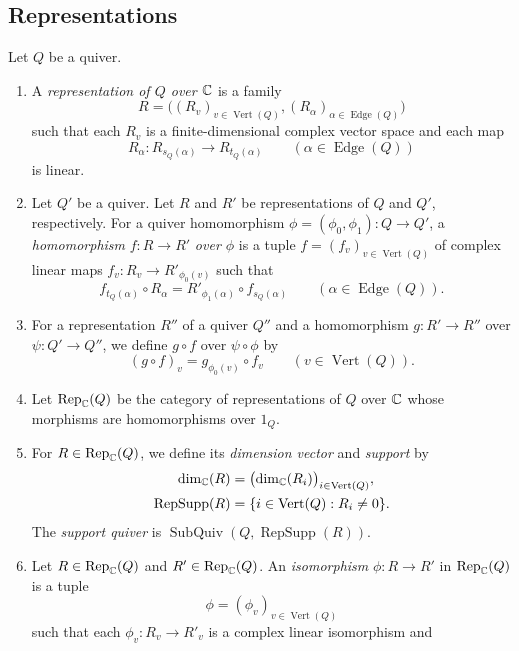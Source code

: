 \subsection{Representations}\label{subsec:quiver-representations}
\begin{definition}\label{def:quiver-representations}
Let $Q$ be a quiver.
\begin{enumerate}[font=\itshape]
\item A \textit{representation of $Q$ over $\mathbb C$} is a family
\[
 R=\bigl((R_v)_{v\in\operatorname{Vert}(Q)},
 (R_\alpha)_{\alpha\in\operatorname{Edge}(Q)}\bigr)
\]
such that each $R_v$ is a finite-dimensional complex vector space and each map
\[
 R_\alpha:R_{s_Q(\alpha)}\longrightarrow R_{t_Q(\alpha)}
 \qquad(\alpha\in\operatorname{Edge}(Q))
\]
is linear.
\item\label{d:representation-hom} Let $Q'$ be a quiver. Let $R$ and $R'$ be representations of $Q$ and $Q'$, respectively.
For a quiver homomorphism $\phi=(\phi_0,\phi_1):Q\to Q'$, a \textit{homomorphism}
$f:R\to R'$ \textit{over $\phi$} is a tuple $f=(f_v)_{v\in\operatorname{Vert}(Q)}$ of complex linear maps
$f_v:R_v\to R'_{\phi_0(v)}$ such that
\[
 f_{t_Q(\alpha)}\circ R_\alpha
 =R'_{\phi_1(\alpha)}\circ f_{s_Q(\alpha)}
 \qquad(\alpha\in\operatorname{Edge}(Q)).
\]
\item For a representation $R''$ of a quiver $Q''$ and a homomorphism $g:R'\to R''$
over $\psi:Q'\to Q''$, we define $g\circ f$ over $\psi\circ\phi$ by
\[
 (g\circ f)_v=g_{\phi_0(v)}\circ f_v\qquad(v\in\operatorname{Vert}(Q)).
\]
\item Let $\operatorname{Rep}_{\mathbb C}(Q)$ be the category of representations of $Q$ over $\mathbb C$ whose morphisms are homomorphisms over $1_Q$.
\item For $R\in\operatorname{Rep}_{\mathbb C}(Q)$, we define its \textit{dimension vector} and \textit{support} by
\[
\begin{aligned}
 \dim_{\mathbb C}(R)&=\bigl(\dim_{\mathbb C}(R_i)\bigr)_{i\in\operatorname{Vert}(Q)},\\
 \operatorname{RepSupp}(R)&=\{i\in\operatorname{Vert}(Q):R_i\ne0\}.
\end{aligned}
\]
The \textit{support quiver} is $\operatorname{SubQuiv}(Q,\operatorname{RepSupp}(R))$.
\item Let $R\in\operatorname{Rep}_{\mathbb C}(Q)$ and $R'\in\operatorname{Rep}_{\mathbb C}(Q)$.
An \textit{isomorphism} $\phi:R\to R'$ in $\operatorname{Rep}_{\mathbb C}(Q)$ is a tuple
\[
 \phi=(\phi_v)_{v\in\operatorname{Vert}(Q)}
\]
such that each $\phi_v:R_v\to R'_v$ is a complex linear isomorphism and

\end{enumerate}
\end{definition}
